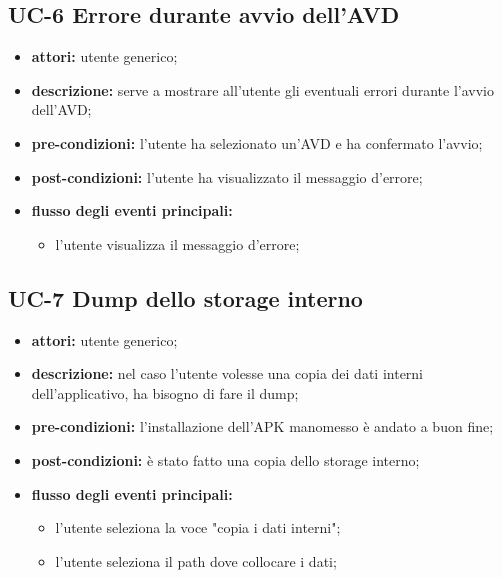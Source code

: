 \subsection*{UC-6 Errore durante avvio dell'AVD}\label{subsec:uc-6-errore-durante-avvio-dell'avd}
\begin{itemize}
    \item \textbf{attori:} utente generico;
    \item \textbf{descrizione:} serve a mostrare all'utente gli eventuali errori durante l'avvio dell'AVD;
    \item \textbf{pre-condizioni:} l'utente ha selezionato un'AVD e ha confermato l'avvio;
    \item \textbf{post-condizioni:} l'utente ha visualizzato il messaggio d'errore;
    \item \textbf{flusso degli eventi principali:}
    \begin{itemize}
        \item l'utente visualizza il messaggio d'errore;
    \end{itemize}
\end{itemize}
\subsection*{UC-7 Dump dello storage interno}\label{subsec:uc-6-dump-dello-storage-interno}
\begin{itemize}
    \item \textbf{attori:} utente generico;
    \item \textbf{descrizione:} nel caso l'utente volesse una copia dei dati interni dell'applicativo, ha bisogno di fare il dump;
    \item \textbf{pre-condizioni:} l'installazione dell'APK manomesso è andato a buon fine;
    \item \textbf{post-condizioni:} è stato fatto una copia dello storage interno;
    \item \textbf{flusso degli eventi principali:}
    \begin{itemize}
        \item l'utente seleziona la voce "copia i dati interni";
        \item l'utente seleziona il path dove collocare i dati;
    \end{itemize}
\end{itemize}

